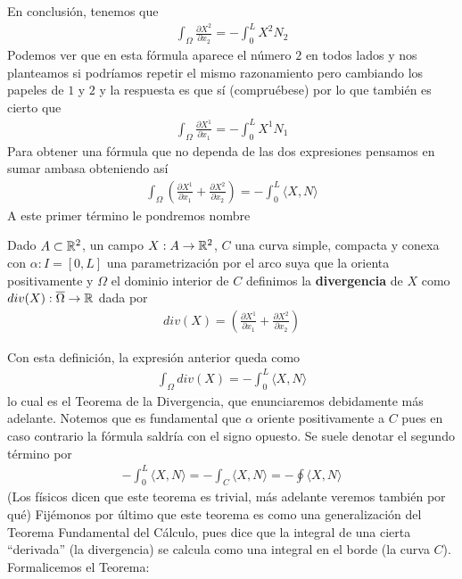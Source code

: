 En conclusión, tenemos que 
\begin{gather*}
    \boxed{\int_\Omega \frac{\partial X^2}{\partial x_2} = - \int_0^L X^2 N_2}
\end{gather*}
Podemos ver que en esta fórmula aparece el número $2$ en todos lados y nos planteamos si podríamos repetir el mismo razonamiento pero cambiando los papeles de $1$ y $2$ y la respuesta es que sí (compruébese) por lo que también es cierto que
\begin{gather*}
    \boxed{\int_\Omega \frac{\partial X^1}{\partial x_1} = - \int_0^L X^1 N_1}
\end{gather*}
Para obtener una fórmula que no dependa de las dos expresiones pensamos en sumar ambasa obteniendo así
\begin{gather*}
    \int_\Omega \left( \frac{\partial X^1}{\partial x_1} + \frac{\partial X^2}{\partial x_2} \right) = - \int_0^L \langle X, N \rangle
\end{gather*}
A este primer término le pondremos nombre
\begin{definicion}
    Dado $A\subset \mathbb{R}^2$, un campo $X:A \to \mathbb{R}^2$, $C$ una curva simple, compacta y conexa con $\alpha: I=[0,L]$ una parametrización por el arco suya que la orienta positivamente y $\Omega$ el dominio interior de $C$ definimos la \textbf{divergencia} de $X$ como $div(X):\overline{\Omega}\to \mathbb{R}$ dada por
    \begin{gather*}
        div(X) = \left( \frac{\partial X^1}{\partial x_1} + \frac{\partial X^2}{\partial x_2} \right)
    \end{gather*}
\end{definicion}

Con esta definición, la expresión anterior queda como 
\begin{gather*}
    \boxed{\int_\Omega div(X) = - \int_0^L \langle X, N \rangle}
\end{gather*}
lo cual es el Teorema de la Divergencia, que enunciaremos debidamente más adelante. Notemos que es fundamental que $\alpha$ oriente positivamente a $C$ pues en caso contrario la fórmula saldría con el signo opuesto. Se suele denotar el segundo término por 
\begin{gather*}
    - \int_0^L \langle X, N \rangle = - \int_C \langle X, N \rangle = - \oint \langle X, N \rangle
\end{gather*}
(Los físicos dicen que este teorema es trivial, más adelante veremos también por qué) Fijémonos por último que este teorema es como una generalización del Teorema Fundamental del Cálculo, pues dice que la integral de una cierta ``derivada'' (la divergencia) se calcula como una integral en el borde (la curva $C$). Formalicemos el Teorema:

